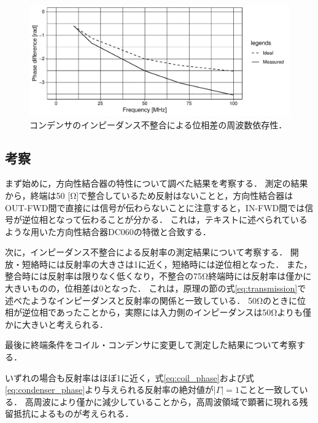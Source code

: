 \documentclass[uplatex,dvipdfmx,a4j,12pt]{jsarticle}
\begin{document}
\begin{figure}[H]
\centering
\includegraphics[width=\linewidth]{data/2_2/phase_diff.pdf}
\caption{コンデンサのインピーダンス不整合による位相差の周波数依存性．}
\label{fig:2-4}
\end{figure}

\subsection{考察}
まず始めに，方向性結合器の特性について調べた結果を考察する．
測定の結果から，終端は50 [\si{\ohm}]で整合しているため反射はないことと，方向性結合器はOUT-FWD間で直接には信号が伝わらないことに注意すると，IN-FWD間では信号が逆位相となって伝わることが分かる．
これは，テキストに述べられているような用いた方向性結合器DC060の特徴と合致する．

次に，インピーダンス不整合による反射率の測定結果について考察する．
開放・短絡時には反射率の大きさは1に近く，短絡時には逆位相となった．
また，整合時には反射率は限りなく低くなり，不整合の75\si{\ohm}終端時には反射率は僅かに大きいものの，位相差は0となった．
これは，原理の節の式\ref{eq:transmission}で述べたようなインピーダンスと反射率の関係と一致している．
50\si{\ohm}のときに位相が逆位相であったことから，実際には入力側のインピーダンスは50\si{\ohm}よりも僅かに大きいと考えられる．

最後に終端条件をコイル・コンデンサに変更して測定した結果について考察する．

いずれの場合も反射率はほぼ1に近く，式\ref{eq:coil_phase}および式\ref{eq:condenser_phase}より与えられる反射率の絶対値が$|\Gamma| = 1$ことと一致している．
高周波により僅かに減少していることから，高周波領域で顕著に現れる残留抵抗によるものが考えられる．
\end{document}
